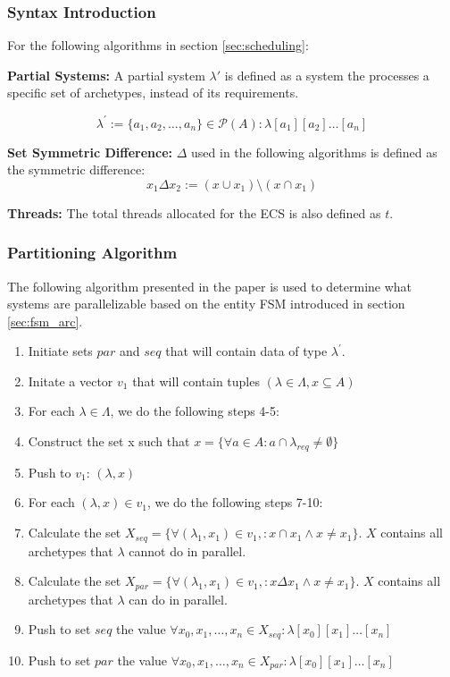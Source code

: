 \subsubsection{Syntax Introduction}
For the following algorithms in section \ref{sec:scheduling}:

\textbf{Partial Systems:} A partial system $\lambda'$ is defined as a system the processes a specific set of archetypes, instead of its requirements.

\begin{equation}
    \lambda^\prime := \{a_1,a_2,\ldots,a_n\} \in \mathcal{P}(A) : \lambda[a_1][a_2]\ldots[a_n]
    \label{eq:partial_lambda}
\end{equation}

\textbf{Set Symmetric Difference:} $\Delta$ used in the following algorithms is defined as the symmetric difference: 
$$x_1 \Delta x_2 := (x \cup x_1) \setminus (x \cap x_1)$$

\textbf{Threads:} The total threads allocated for the ECS is also defined as $t$. \\

\subsubsection{Partitioning Algorithm}
\label{alg:part}
The following algorithm presented in the paper is used to determine what systems are parallelizable based on the entity FSM introduced in section \ref{sec:fsm_arc}. 

\begin{enumerate}
    \item Initiate sets $par$ and $seq$ that will contain data of type $\lambda^\prime$.
    \item Initate a vector $v_1$ that will contain tuples $(\lambda \in \Lambda, x \subseteq A)$
    \item For each $\lambda \in \Lambda$, we do the following steps 4-5:
    \item Construct the set x such that $x = \{ \forall a \in A : a \cap \lambda_{req} \not= \emptyset \}$
    \item Push to $v_1$: $(\lambda, x)$
    \item For each $(\lambda, x) \in v_1$, we do the following steps 7-10:
    \item Calculate the set $X_{seq} = \{ \forall (\lambda_1, x_1) \in v_1, : x \cap x_1  \land x \not= x_1 \}$. $X$ contains all archetypes that $\lambda$ cannot do in parallel.
    \item Calculate the set $X_{par} = \{ \forall (\lambda_1, x_1) \in v_1, : x \Delta x_1  \land x \not= x_1 \}$. $X$ contains all archetypes that $\lambda$ can do in parallel.
    \item Push to set $seq$ the value $ \forall x_0,x_1,\ldots,x_n \in X_{seq} : \lambda[x_0][x_1]\ldots[x_n]$
    \item Push to set $par$ the value $ \forall x_0,x_1,\ldots,x_n \in X_{par} : \lambda[x_0][x_1]\ldots[x_n]$
\end{enumerate}

